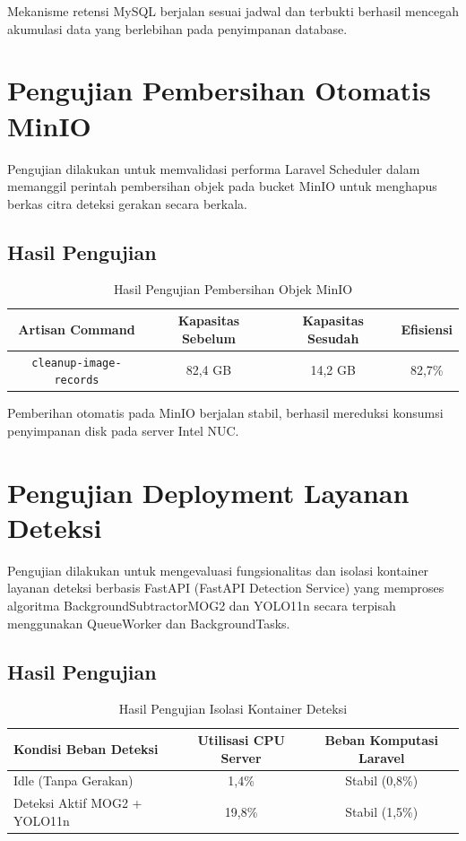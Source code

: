 Mekanisme retensi MySQL berjalan sesuai jadwal dan terbukti berhasil mencegah akumulasi data yang berlebihan pada penyimpanan database.

\section{Pengujian Pembersihan Otomatis MinIO}

Pengujian dilakukan untuk memvalidasi performa Laravel Scheduler dalam memanggil perintah pembersihan objek pada bucket MinIO untuk menghapus berkas citra deteksi gerakan secara berkala.

\subsection{Hasil Pengujian}

\begin{table}[H]
	\centering
	\caption{Hasil Pengujian Pembersihan Objek MinIO}
	\begin{tabular}{|c|c|c|c|}
		\hline
		Artisan Command & Kapasitas Sebelum & Kapasitas Sesudah & Efisiensi \\
		\hline
		\texttt{cleanup-image-records} & 82,4 GB & 14,2 GB & 82,7\% \\
		\hline
	\end{tabular}
\end{table}

Pemberihan otomatis pada MinIO berjalan stabil, berhasil mereduksi konsumsi penyimpanan disk pada server Intel NUC.

\section{Pengujian Deployment Layanan Deteksi}

Pengujian dilakukan untuk mengevaluasi fungsionalitas dan isolasi kontainer layanan deteksi berbasis FastAPI (FastAPI Detection Service) yang memproses algoritma BackgroundSubtractorMOG2 dan YOLO11n secara terpisah menggunakan QueueWorker dan BackgroundTasks.

\subsection{Hasil Pengujian}

\begin{table}[H]
	\centering
	\caption{Hasil Pengujian Isolasi Kontainer Deteksi}
	\begin{tabular}{|l|c|c|}
		\hline
		Kondisi Beban Deteksi & Utilisasi CPU Server & Beban Komputasi Laravel \\
		\hline
		Idle (Tanpa Gerakan) & 1,4\% & Stabil (0,8\%) \\
		Deteksi Aktif MOG2 + YOLO11n & 19,8\% & Stabil (1,5\%) \\
		\hline
	\end{tabular}
\end{table}


